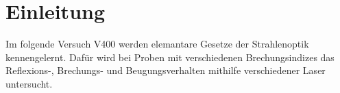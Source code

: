 \section{Einleitung}
\label{sec:einleitung}
Im folgende Versuch V400 werden elemantare Gesetze der Strahlenoptik 
kennengelernt. Dafür wird bei Proben mit verschiedenen Brechungsindizes
das Reflexions-, Brechungs- und Beugungsverhalten mithilfe verschiedener 
Laser untersucht. 